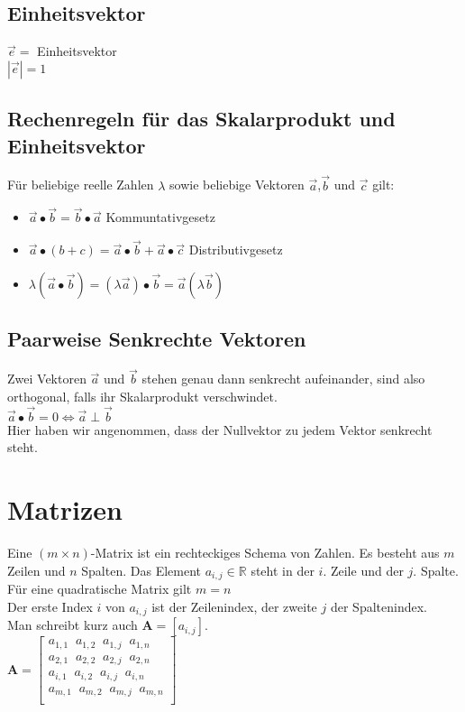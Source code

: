 \documentclass[../main.tex]{subfiles}
\begin{document}
\subsection{Einheitsvektor}
$\vec{e}=$ Einheitsvektor \\
$|\vec{e}|=1$

\subsection{Rechenregeln für das Skalarprodukt und Einheitsvektor}
Für beliebige reelle Zahlen $\lambda$ sowie beliebige Vektoren $\vec{a}$,$\vec{b}$ und $\vec{c}$ gilt: 
\begin{itemize}
    \item $\vec{a}\bullet\vec{b}=\vec{b}\bullet\vec{a}$ Kommuntativgesetz
    \item $\vec{a}\bullet(b+c)=\vec{a}\bullet\vec{b}+\vec{a}\bullet\vec{c}$ Distributivgesetz
    \item $\lambda(\vec{a}\bullet\vec{b})=(\lambda\vec{a})\bullet\vec{b}=\vec{a}(\lambda\vec{b})$
\end{itemize}

\subsection{Paarweise Senkrechte Vektoren}
Zwei Vektoren $\vec{a}$ und $\vec{b}$ stehen genau dann senkrecht aufeinander, sind 
also orthogonal, falls ihr Skalarprodukt verschwindet. \\ [7pt]
$\vec{a}\bullet\vec{b}=0 \iff \vec{a}\perp\vec{b}$ \\ [7pt]
Hier haben wir angenommen, dass der Nullvektor zu jedem Vektor senkrecht steht.

\section{Matrizen}
Eine $(m\times n)$-Matrix ist ein rechteckiges Schema von Zahlen. Es besteht aus $m$ Zeilen
und $n$ Spalten. Das Element $a_{i,j}\in\mathbb{R}$ steht in der $i$. Zeile und der $j$. Spalte. \\ [7pt]
Für eine quadratische Matrix gilt $m=n$ \\ [7pt]
Der erste Index $i$ von $a_{i,j}$ ist der Zeilenindex, der zweite $j$ der Spaltenindex. \\ [7pt]
Man schreibt kurz auch $\mathbf{A}=[a_{i,j}]$. \\ [7pt]

$\mathbf{A}= 
\begin{bmatrix}
    a_{1,1} \;\; a_{1,2} \;\; a_{1,j} \;\; a_{1,n} \\
    a_{2,1} \;\; a_{2,2} \;\; a_{2,j} \;\; a_{2,n} \\
    a_{i,1} \;\; a_{i,2} \;\; a_{i,j} \;\; a_{i,n} \\
    a_{m,1} \;\; a_{m,2} \;\; a_{m,j} \;\; a_{m,n} \\
\end{bmatrix}$
\end{document}
